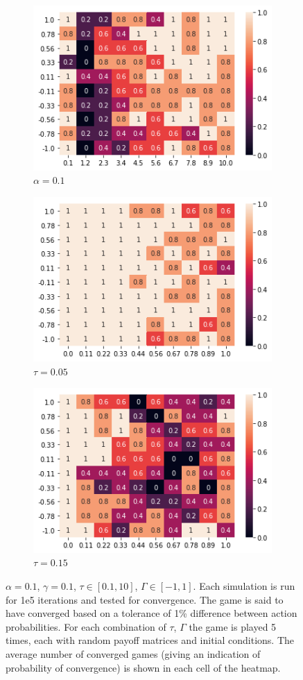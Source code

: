 \documentclass[.../main.tex]{subfiles}
\begin{document}
\begin{figure}[h]
\begin{subfigure}[b]{0.45 \textwidth}
	\end{subfigure}
	\begin{subfigure}[b]{0.45 \textwidth}
	\centering
	\includegraphics[width = 0.7 \textwidth]{Figures/Alpha_2_Run_2.png}
	\caption{$\alpha = 0.1$}
	\end{subfigure}
	\begin{subfigure}[b]{0.45 \textwidth}
	\centering
	\includegraphics[width = 0.7 \textwidth]{Figures/AlphaRun_tau_005.png}
	\caption{$\tau = 0.05$}
	\end{subfigure}
	\begin{subfigure}[b]{0.45 \textwidth}
	\centering
	\includegraphics[width = 0.7 \textwidth]{Figures/tau_015.png}
	\caption{$\tau = 0.15$}
	\end{subfigure}

	\caption{$\alpha = 0.1$, $\gamma = 0.1$, $\tau \in [0.1, 10]$, $\Gamma \in [-1, 1]$. Each
	simulation is run for 1e5 iterations and tested for convergence. The game is said to have
	converged based on a tolerance of 1\% difference between action probabilities. For each
	combination of $\tau$, $\Gamma$ the game is played 5 times, each with random payoff matrices
	and initial conditions. The average number of converged games (giving an indication of
	probability of convergence) is shown in each cell of the heatmap. \label{fig::Toys}}
\end{figure}
\end{document}
